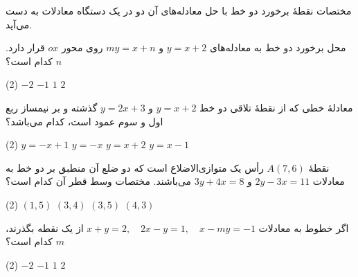 \begin{remark}[توجه]
مختصات نقطۀ برخورد دو خط با حل معادله‌های آن دو در یک دستگاه
معادلات به دست می‌آید.
\end{remark}

\begin{example}
محل برخورد دو خط به معادله‌های
\(y=x+2\) و \(my=x+n\)
روی محور \(ox\) قرار دارد. \(n\) کدام است؟

\begin{tasks}(2)
    \task \(-2\)
    \task \(-1\)
    \task \(1\)
    \task \(2\)
\end{tasks}
\end{example}

\begin{example}
معادلۀ خطی که از نقطۀ تلاقی دو خط
\(y=x+2\) و \(y=2x+3\)
گذشته و بر نیمساز ربع اول و سوم عمود است،
کدام می‌باشد؟

\begin{tasks}(2)
    \task \(y=-x+1\)
    \task \(y=-x\)
    \task \(y=x+2\)
    \task \(y=x-1\)
\end{tasks}
\end{example}

\begin{example}
نقطۀ \(A(7,6)\) رأس یک متوازی‌الاضلاع است که
دو ضلع آن منطبق بر دو خط به معادلات
\(2y-3x=11\) و \(3y+4x=8\)
می‌باشند. مختصات وسط قطر آن کدام است؟

\begin{tasks}(2)
    \task \((1,5)\)
    \task \((3,4)\)
    \task \((3,5)\)
    \task \((4,3)\)
\end{tasks}
\end{example}


\begin{example}
اگر خطوط به معادلات
\(
    x+y=2,\quad 2x-y=1,\quad x-my=-1
\)
از یک نقطه بگذرند، \(m\) کدام است؟

\begin{flushright}
\begin{minipage}{0.38\textwidth}
    \begin{tasks}(2)
        \task \(-2\)
        \task \(-1\)
        \task \(1\)
        \task \(2\)
    \end{tasks}
\end{minipage}
\end{flushright}
\end{example}

